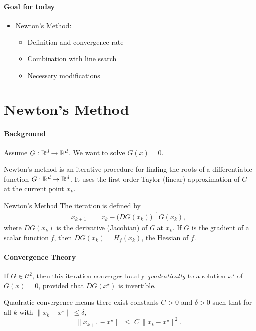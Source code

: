 \paragraph{Goal for today}
\begin{itemize}
  \item Newton's Method:
        \begin{itemize}
          \item Definition and convergence rate
          \item Combination with line search
          \item Necessary modifications
        \end{itemize}
\end{itemize}

\section*{Newton's Method}

\paragraph{Background}
Assume \(G: \mathbb{R}^d \to \mathbb{R}^d\). We want to solve \(G(x) = 0\).

Newton's method is an iterative procedure for finding the roots of a differentiable function \(G: \mathbb{R}^d \to \mathbb{R}^d\).
It uses the first-order Taylor (linear) approximation of \(G\) at the current point \(x_k\).

\begin{definition}{Newton's Method}{}
  The iteration is defined by
  \begin{align*}
    x_{k+1} & = x_k - \bigl(D G(x_k)\bigr)^{-1} G(x_k),
  \end{align*}
  where \(D G(x_k)\) is the derivative (Jacobian) of \(G\) at \(x_k\). If \(G\) is the gradient of a scalar function \(f\), then \(DG(x_k) = H_f(x_k)\), the Hessian of \(f\).
\end{definition}

\paragraph{Convergence Theory}
If \(G\in \mathcal{C}^2\), then this iteration converges locally \emph{quadratically} to
a solution \(x^\star\) of \(G(x) = 0\), provided that \(D G(x^\star)\) is invertible.

\begin{remark}
  Quadratic convergence means there exist constants \(C>0\) and \(\delta>0\) such that for all \(k\) with \(\|x_k - x^\star\|\le \delta\),
  \[
    \|x_{k+1} - x^\star\| \;\le\; C \,\|x_k - x^\star\|^2.
  \]
\end{remark}

